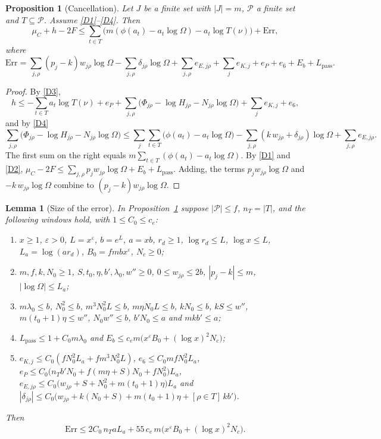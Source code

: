 \documentclass[11pt]{amsart}
\newcommand{\eps}{\varepsilon}
\theoremstyle{plain}
\newtheorem{proposition}[theorem]{Proposition}
\newtheorem{lemma}[theorem]{Lemma}
\theoremstyle{definition}
\numberwithin{equation}{section}
\begin{document}
\begin{proposition}[Cancellation]\label{prop:cancel}
Let $J$ be a finite set with $|J|=m$, $\mathcal P$ a finite set and $T\subseteq\mathcal P$. Assume
\ref{D1}--\ref{D4}. Then
\[
\mu_C+h-2F\le\sum_{t\in T}\bigl(m(\phi(a_t)-a_t\log\Omega)-a_t\log T(\nu)\bigr)+\mathrm{Err},
\]
where
\[
\mathrm{Err}=\sum_{j,\rho}(p_j-k)w_{j\rho}\log\Omega-\sum_{j,\rho}\delta_{j\rho}\log\Omega
+\sum_{j,\rho}e_{E,j\rho}+\sum_je_{K,j}+e_P+e_6+E_b+L_{\mathrm{pass}}.
\]
\end{proposition}

\begin{proof}
By \ref{D3},
\[
h\le-\sum_{t\in T}a_t\log T(\nu)+e_P+\sum_{j,\rho}\bigl(\Phi_{j\rho}-\log H_{j\rho}-N_{j\rho}\log\Omega\bigr)+\sum_je_{K,j}+e_6,
\]
and by \ref{D4}
\[
\sum_{j,\rho}\bigl(\Phi_{j\rho}-\log H_{j\rho}-N_{j\rho}\log\Omega\bigr)\le
\sum_{j}\sum_{t\in T}\bigl(\phi(a_t)-a_t\log\Omega\bigr)-\sum_{j,\rho}(k\,w_{j\rho}+\delta_{j\rho})\log\Omega+\sum_{j,\rho}e_{E,j\rho}.
\]
The first sum on the right equals $m\sum_{t\in T}(\phi(a_t)-a_t\log\Omega)$. By \ref{D1} and \ref{D2},
$\mu_C-2F\le\sum_{j,\rho}p_jw_{j\rho}\log\Omega+E_b+L_{\mathrm{pass}}$. Adding, the terms
$p_jw_{j\rho}\log\Omega$ and $-k\,w_{j\rho}\log\Omega$ combine to $(p_j-k)w_{j\rho}\log\Omega$.
\end{proof}

\begin{lemma}[Size of the error]\label{lem:cancelerr}
In Proposition~\ref{prop:cancel} suppose $|\mathcal P|\le f$, $n_T=|T|$, and the following windows
hold, with $1\le C_0\le c_e$:
\begin{enumerate}[label=\textup{(\roman*)}]
\item $x\ge1$, $\eps>0$, $L=x^\eps$, $b=e^L$, $a=xb$, $r_d\ge1$, $\log r_d\le L$, $\log x\le L$,
  $L_a=\log(ar_d)$, $B_0=fmbx^\eps$, $N_c\ge0$;
\item $m,f,k,N_0\ge1$, $S,t_0,\eta,b',\lambda_0,w''\ge0$, $0\le w_{j\rho}\le2b$, $|p_j-k|\le m$, $|\log\Omega|\le L_a$;
\item $m\lambda_0\le b$, $N_0^2\le b$, $m^3N_0^2L\le b$, $m\eta N_0L\le b$, $kN_0\le b$, $kS\le w''$,
  $m(t_0+1)\eta\le w''$, $N_0w''\le b$, $b'N_0\le a$ and $mkb'\le a$;
\item $L_{\mathrm{pass}}\le1+C_0m\lambda_0$ and $E_b\le c_em\bigl(x^\eps B_0+(\log x)^2N_c\bigr)$;
\item $e_{K,j}\le C_0(fN_0^2L_a+fm^3N_0^2L)$, $e_6\le C_0mfN_0^2L_a$,
  $e_P\le C_0\bigl(n_Tb'N_0+f(m\eta+S)N_0+fN_0^2\bigr)L_a$,
  $e_{E,j\rho}\le C_0\bigl(w_{j\rho}+S+N_0^2+m(t_0+1)\eta\bigr)L_a$ and
  $|\delta_{j\rho}|\le C_0\bigl(w_{j\rho}+k(N_0+S)+m(t_0+1)\eta+[\rho\in T]\,kb'\bigr)$.
\end{enumerate}
Then
\[
\mathrm{Err}\le2C_0\,n_TaL_a+55\,c_e\,m\bigl(x^\eps B_0+(\log x)^2N_c\bigr).
\]
\end{lemma}
\end{document}
